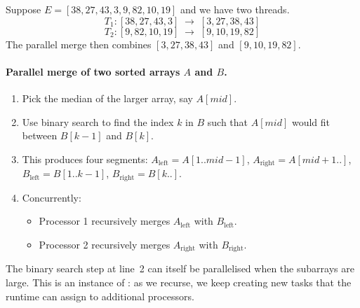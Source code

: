 \begin{ppexample}
Suppose $E = [38, 27, 43, 3, 9, 82, 10, 19]$ and we have two threads.
\[
  T_1: [38,27,43,3] \;\longrightarrow\; [3,27,38,43]
\]
\[
  T_2: [9,82,10,19] \;\longrightarrow\; [9,10,19,82]
\]
The parallel merge then combines $[3,27,38,43]$ and $[9,10,19,82]$.
\end{ppexample}

\paragraph{Parallel merge of two sorted arrays $A$ and $B$.}
\begin{enumerate}
  \item Pick the median of the larger array, say $A[\mathit{mid}]$.
  \item Use binary search to find the index $k$ in $B$ such that
        $A[\mathit{mid}]$ would fit between $B[k-1]$ and $B[k]$.
  \item This produces four segments: $A_{\text{left}} = A[1..\mathit{mid}{-}1]$,
        $A_{\text{right}} = A[\mathit{mid}{+}1..]$, $B_{\text{left}} = B[1..k{-}1]$,
        $B_{\text{right}} = B[k..]$.
  \item Concurrently:
        \begin{itemize}
          \item Processor 1 recursively merges $A_{\text{left}}$ with
                $B_{\text{left}}$.
          \item Processor 2 recursively merges $A_{\text{right}}$ with
                $B_{\text{right}}$.
        \end{itemize}
\end{enumerate}

The binary search step at line~2 can itself be parallelised when the
subarrays are large.  This is an instance of : as we recurse, we keep creating new tasks that the
runtime can assign to additional processors.

